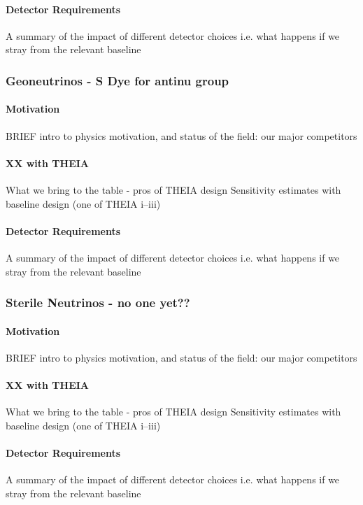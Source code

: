 \documentclass[11pt,prd,letterpaper,amsmath,amssymb,final,nofootinbib
,unsortedaddress,superscriptaddress
]{revtex4-1}
\begin{document}
\paragraph{Detector Requirements}
A summary of the impact of different detector choices i.e. what happens if we stray from the relevant baseline
\subsubsection{Geoneutrinos - S Dye for antinu group}
\paragraph{Motivation}
BRIEF intro to physics motivation, and status of the field: our major competitors
\paragraph{XX with THEIA}
What we bring to the table - pros of THEIA design \newline
Sensitivity estimates with baseline design (one of THEIA i--iii)
\paragraph{Detector Requirements}
A summary of the impact of different detector choices i.e. what happens if we stray from the relevant baseline
\subsubsection{Sterile Neutrinos - no one yet??}
\paragraph{Motivation}
BRIEF intro to physics motivation, and status of the field: our major competitors
\paragraph{XX with THEIA}
What we bring to the table - pros of THEIA design \newline
Sensitivity estimates with baseline design (one of THEIA i--iii)
\paragraph{Detector Requirements}
A summary of the impact of different detector choices i.e. what happens if we stray from the relevant baseline
\end{document}
